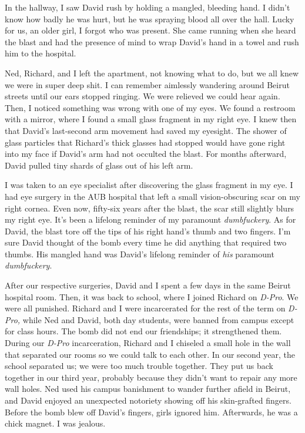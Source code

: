 In the hallway, I saw David rush by holding a mangled, bleeding hand. I
didn't know how badly he was hurt, but he was spraying blood all over
the hall. Lucky for us, an older girl, I forgot who was present. She
came running when she heard the blast and had the presence of mind to
wrap David's hand in a towel and rush him to the hospital.

Ned, Richard, and I left the apartment, not knowing what to do, but we
all knew we were in super deep shit. I can remember aimlessly wandering
around Beirut streets until our ears stopped ringing. We were relieved
we could hear again. Then, I noticed something was wrong with one of my
eyes. We found a restroom with a mirror, where I found a small glass
fragment in my right eye. I knew then that David's last-second arm
movement had saved my eyesight. The shower of glass particles that
Richard's thick glasses had stopped would have gone right into my face
if David's arm had not occulted the blast. For months afterward, David
pulled tiny shards of glass out of his left arm.

I was taken to an eye specialist after discovering the glass fragment in
my eye. I had eye surgery in the AUB hospital that left a small
vision-obscuring scar on my right cornea. Even now, fifty-six years
after the blast, the scar still slightly blurs my right eye. It's been a
lifelong reminder of my paramount \emph{dumbfuckery}. As for David, the
blast tore off the tips of his right hand's thumb and two fingers. I'm
sure David thought of the bomb every time he did anything that required
two thumbs. His mangled hand was David's lifelong reminder of \emph{his}
paramount \emph{dumbfuckery}.

After our respective surgeries, David and I spent a few days in the same
Beirut hospital room. Then, it was back to school, where I joined
Richard on \emph{D-Pro}. We were all punished. Richard and I were
incarcerated for the rest of the term on \emph{D-Pro,} while Ned and
David, both day students, were banned from campus except for class
hours. The bomb did not end our friendships; it strengthened them.
During our \emph{D-Pro} incarceration, Richard and I chiseled a small
hole in the wall that separated our rooms so we could talk to each
other. In our second year, the school separated us; we were too
much trouble together. They put us back together in our third year,
probably because they didn't want to repair any more wall holes. Ned
used his campus banishment to wander further afield in Beirut, and David
enjoyed an unexpected notoriety showing off his skin-grafted fingers.
Before the bomb blew off David's fingers, girls ignored him. Afterwards,
he was a chick magnet. I was jealous.


